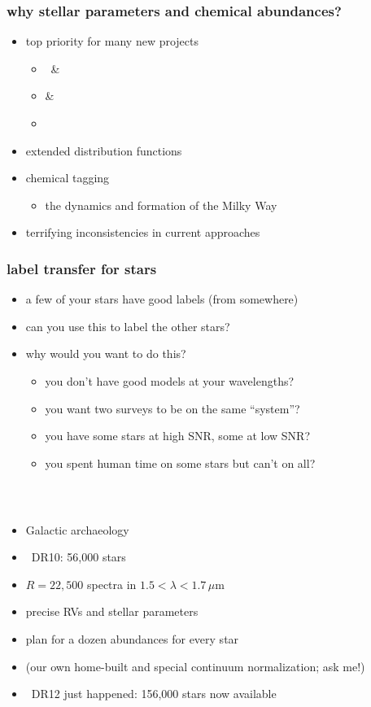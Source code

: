 \documentclass[pdftex]{beamer}
\begin{document}
\begin{frame}
  \frametitle{why stellar parameters and chemical abundances?}
  \begin{itemize}
  \item top priority for many new projects
    \begin{itemize}
    \item \gaia\ \& 
    \item {} \& 
    \item \sdssiii\ \apogee
    \end{itemize}
  \item extended distribution functions
  \item chemical tagging
    \begin{itemize}
    \item the dynamics and formation of the Milky Way
    \end{itemize}
  \item terrifying inconsistencies in current approaches
  \end{itemize}
\end{frame}

\begin{frame}
  \frametitle{label transfer for stars}
  \begin{itemize}
  \item a few of your stars have good labels (from somewhere)
  \item can you use this to label the other stars?
  \item why would you want to do this?
    \begin{itemize}
    \item<2> you don't have good models at your wavelengths?
    \item<2> you want two surveys to be on the same ``system''?
    \item<2> you have some stars at high SNR, some at low SNR?
    \item<2> you spent human time on some stars but can't on all?
    \end{itemize}
  \end{itemize}
\end{frame}

\begin{frame}
  \frametitle{\sdssiii\ \apogee}
  \begin{itemize}
  \item Galactic archaeology
  \item \apogee\ DR10: 56,000 stars
  \item $R=22,500$ spectra in $1.5<\lambda<1.7\,\mu\mathrm{m}$
  \item precise RVs and stellar parameters
  \item plan for a dozen abundances for every star
  \item (our own home-built and special continuum normalization; ask me!)
  \item \apogee\ DR12 just happened: 156,000 stars now available
  \end{itemize}
\end{frame}
\end{document}
